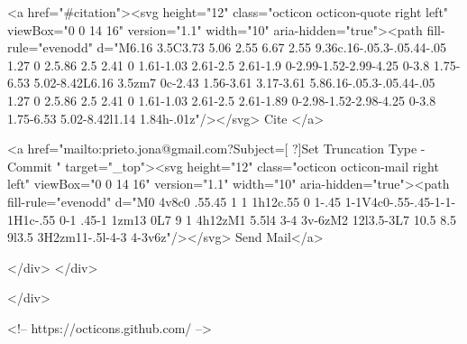       <a  href="#citation"><svg height="12" class="octicon octicon-quote right left" viewBox="0 0 14 16" version="1.1" width="10" aria-hidden="true"><path fill-rule="evenodd" d="M6.16 3.5C3.73 5.06 2.55 6.67 2.55 9.36c.16-.05.3-.05.44-.05 1.27 0 2.5.86 2.5 2.41 0 1.61-1.03 2.61-2.5 2.61-1.9 0-2.99-1.52-2.99-4.25 0-3.8 1.75-6.53 5.02-8.42L6.16 3.5zm7 0c-2.43 1.56-3.61 3.17-3.61 5.86.16-.05.3-.05.44-.05 1.27 0 2.5.86 2.5 2.41 0 1.61-1.03 2.61-2.5 2.61-1.89 0-2.98-1.52-2.98-4.25 0-3.8 1.75-6.53 5.02-8.42l1.14 1.84h-.01z"/></svg> Cite
      </a>

      <a href="mailto:prieto.jona@gmail.com?Subject=[ ?]Set Truncation Type - Commit " target="_top"><svg height="12" class="octicon octicon-mail right left" viewBox="0 0 14 16" version="1.1" width="10" aria-hidden="true"><path fill-rule="evenodd" d="M0 4v8c0 .55.45 1 1 1h12c.55 0 1-.45 1-1V4c0-.55-.45-1-1-1H1c-.55 0-1 .45-1 1zm13 0L7 9 1 4h12zM1 5.5l4 3-4 3v-6zM2 12l3.5-3L7 10.5 8.5 9l3.5 3H2zm11-.5l-4-3 4-3v6z"/></svg> Send Mail</a>

    </div>
  </div>

</div>

<!-- https://octicons.github.com/ -->





